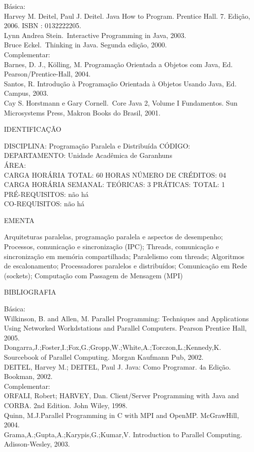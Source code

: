 \documentclass[
	12pt,				%
	openright,			%
  oneside,     %
	a4paper,			%
	english,			%
	french,				%
	spanish,			%
	brazil				%
	]{abntex2}
\begin{document}
\begin{apendicesenv}
Básica:\\
Harvey M. Deitel, Paul J. Deitel. Java How to Program. Prentice Hall. 7.
Edição, 2006. ISBN : 0132222205.\\
Lynn Andrea Stein.~Interactive Programming in Java, 2003.\\
Bruce Eckel.~Thinking in Java. Segunda edição, 2000.\\
Complementar:\\
Barnes, D. J., Kölling, M. Programação Orientada a Objetos com Java, Ed.
Pearson/Prentice-Hall, 2004.\\
Santos, R. Introdução à Programação Orientada à Objetos Usando Java, Ed.
Campus, 2003.\\
Cay S. Horstmann e Gary Cornell.~Core Java 2, Volume I  Fundamentos.
Sun Microsystems Press, Makron Books do Brasil, 2001.

\newpage IDENTIFICAÇÃO

DISCIPLINA: Programação Paralela e Distribuída CÓDIGO:\\ 
DEPARTAMENTO: Unidade Acadêmica de Garanhuns\\
ÁREA: \\
CARGA HORÁRIA TOTAL: 60 HORAS NÚMERO DE CRÉDITOS: 04\\
CARGA HORÁRIA SEMANAL: TEÓRICAS: 3 PRÁTICAS: TOTAL: 1\\
PRÉ-REQUISITOS: não há\\
CO-REQUISITOS: não há

EMENTA 

Arquiteturas paralelas, programação paralela e aspectos de desempenho;
Processos, comunicação e sincronização (IPC); Threads, comunicação e
sincronização em memória compartilhada; Paralelismo com threads;
Algoritmos de escalonamento; Processadores paralelos e distribuídos;
Comunicação em Rede (sockets); Computação com Passagem de Mensagem
(MPI)

BIBLIOGRAFIA 

Básica:\\
Wilkinson, B. and Allen, M. Parallel Programming: Techniques and
Applications Using Networked Workdstations and Parallel Computers.
Pearson Prentice Hall, 2005.\\
Dongarra,J.;Foster,I.;Fox,G.;Gropp,W.;White,A.;Torczon,L.;Kennedy,K.
Sourcebook of Parallel Computing. Morgan Kaufmann Pub, 2002.\\
DEITEL, Harvey M.; DEITEL, Paul J. Java: Como Programar. 4a Edição.
Bookman, 2002.\\
Complementar:\\
ORFALI, Robert; HARVEY, Dan. Client/Server Programming with Java and
CORBA. 2nd Edition. John Wiley, 1998.\\
Quinn, M.J.Parallel Programming in C with MPI and OpenMP. McGrawHill,
2004.\\
Grama,A.;Gupta,A.;Karypis,G.;Kumar,V. Introduction to Parallel
Computing. Adisson-Wesley, 2003.


\end{apendicesenv}
\end{document}
